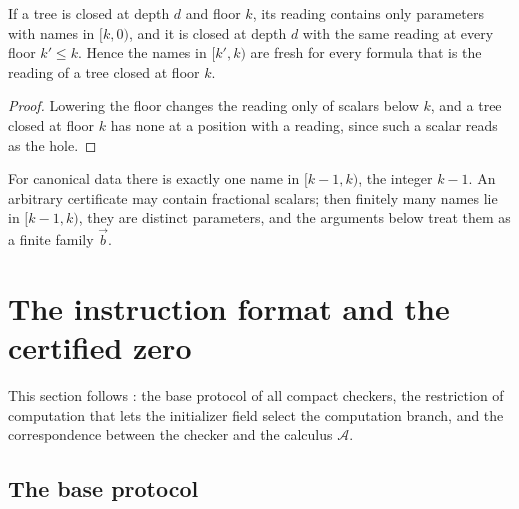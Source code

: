 \begin{lemma}[Freshness]\label{cert:lem:fresh}
If a tree is closed at depth $d$ and floor $k$, its reading contains only
parameters with names in $[k,0)$, and it is closed at depth $d$ with the same
reading at every floor $k'\le k$. Hence the names in $[k',k)$ are fresh for
every formula that is the reading of a tree closed at floor $k$.
\end{lemma}
\begin{proof}
Lowering the floor changes the reading only of scalars below $k$, and a tree
closed at floor $k$ has none at a position with a reading, since such a scalar
reads as the hole.
\end{proof}

For canonical data there is exactly one name in $[k-1,k)$, the integer $k-1$.
An arbitrary certificate may contain fractional scalars; then finitely many
names lie in $[k-1,k)$, they are distinct parameters, and the arguments below
treat them as a finite family $\vec b$.

\section{The instruction format and the certified zero}\label{cert:sec:base}

This section follows : the base protocol of all compact
checkers, the restriction of computation that lets the initializer field
select the computation branch, and the correspondence between the checker and
the calculus $\mathcal A$.

\subsection{The base protocol}

